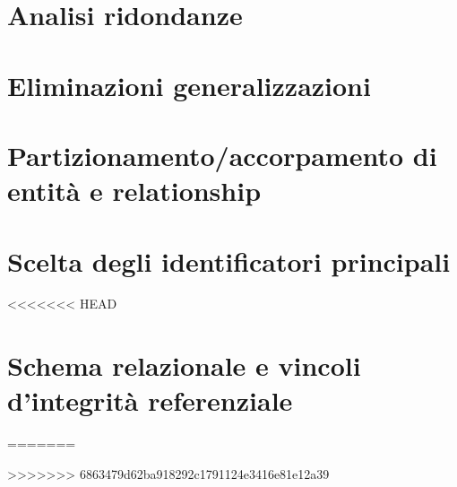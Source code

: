 \section{Analisi ridondanze}
	
	
\section{Eliminazioni generalizzazioni}


\section{Partizionamento/accorpamento di entità e relationship}


\section{Scelta degli identificatori principali}
<<<<<<< HEAD


\section{Schema relazionale e vincoli d'integrità referenziale}

=======

>>>>>>> 6863479d62ba918292c1791124e3416e81e12a39
